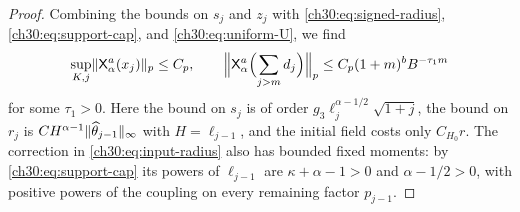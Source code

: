\begin{proof}
Combining the bounds on $s_j$ and $z_j$ with \eqref{ch30:eq:signed-radius}, \eqref{ch30:eq:support-cap}, and \eqref{ch30:eq:uniform-U}, we find
\begin{equation}\label{ch30:eq:uniform-first}
 \sup_{K,j}\lVert \mathsf X_\alpha^a(x_j)\rVert_p\le C_p,\qquad
 \Bigl\lVert\mathsf X_\alpha^a\Bigl(\sum_{j>m}d_j\Bigr)\Bigr\rVert_p\le C_p(1+m)^bB^{-\tau_1m}
\end{equation}
for some $\tau_1>0$. Here the bound on $s_j$ is of order $g_3\ell_j^{\alpha-1/2}\sqrt{1+j}$, the bound on $r_j$ is $CH^{\alpha-1}\lVert \widehat\theta_{j-1}\rVert_\infty$ with $H=\ell_{j-1}$, and the initial field costs only $C_{H_0}r$. The correction in \eqref{ch30:eq:input-radius} also has bounded fixed moments: by \eqref{ch30:eq:support-cap} its powers of $\ell_{j-1}$ are $\kappa+\alpha-1>0$ and $\alpha-1/2>0$, with positive powers of the coupling on every remaining factor $p_{j-1}$.


\end{proof}
